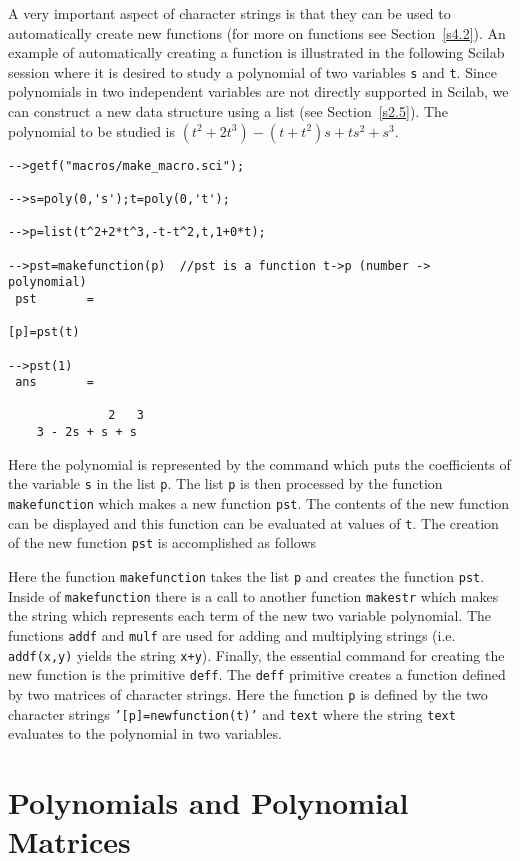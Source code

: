 	A very important aspect of character strings is that they
can be used to automatically create new functions (for more on functions
see Section~\ref{s4.2}).  An example of automatically creating a 
function is illustrated in the following Scilab session where it is
desired to study a polynomial of two variables {\tt s} and {\tt t}.
Since polynomials in two independent variables are not directly 
supported in Scilab, we can construct a new data structure using
a list (see Section~\ref{s2.5}).
The polynomial to be studied is $(t^2+2t^3)-(t+t^2)s+ts^2+s^3$.
\begin{verbatim}
-->getf("macros/make_macro.sci");
 
-->s=poly(0,'s');t=poly(0,'t');
 
-->p=list(t^2+2*t^3,-t-t^2,t,1+0*t);
 
-->pst=makefunction(p)  //pst is a function t->p (number -> polynomial)
 pst       =
 
[p]=pst(t)
 
-->pst(1)
 ans       =
 
              2   3  
    3 - 2s + s + s   
\end{verbatim}
Here the polynomial is represented by the command which puts
the coefficients of the variable {\tt s} in the list {\tt p}.
The list {\tt p} is then processed by the function {\tt makefunction}
which makes a new function {\tt pst}.  The contents of the new function
can be displayed and this function can be evaluated
at values of {\tt t}.  The creation of the new function {\tt pst}
is accomplished as follows



Here the function {\tt makefunction} takes the list {\tt p} and creates the
function {\tt pst}.  Inside of {\tt makefunction} there is a call to another 
function {\tt makestr} which makes the string which represents each 
term of the new two variable polynomial.  The functions {\tt addf} and
{\tt mulf} are used for adding and multiplying strings (i.e. 
{\tt addf(x,y)} yields the string {\tt x+y}).  Finally, the 
essential command for creating the new function 
is the primitive {\tt deff}.  The {\tt deff} primitive 
creates a function defined by two matrices
of character strings.  Here the 
function {\tt p} is defined by the two character strings
{\tt '[p]=newfunction(t)'} and {\tt text} where the string {\tt text}
evaluates to the polynomial in two variables.

\section{Polynomials and Polynomial Matrices}
\label{s2.4}

